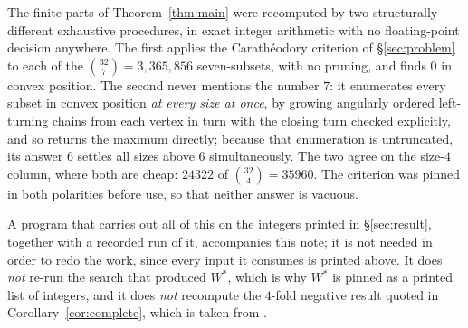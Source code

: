 \documentclass[11pt]{amsart}
\theoremstyle{remark}
\begin{document}
The finite parts of Theorem~\ref{thm:main} were recomputed by two structurally
different exhaustive procedures, in exact integer arithmetic with no
floating-point decision anywhere. The first applies the Carath\'eodory
criterion of \S\ref{sec:problem} to each of the $\binom{32}{7}=3{,}365{,}856$
seven-subsets, with no pruning, and finds $0$ in convex position. The second
never mentions the number $7$: it enumerates every subset in convex position
\emph{at every size at once}, by growing angularly ordered left-turning chains
from each vertex in turn with the closing turn checked explicitly, and so
returns the maximum directly; because that enumeration is untruncated, its
answer $6$ settles all sizes above $6$ simultaneously. The two agree on the
size-$4$ column, where both are cheap: $24322$ of $\binom{32}{4}=35960$. The
criterion was pinned in both polarities before use, so that neither answer is
vacuous.

A program that carries out all of this on the integers printed in
\S\ref{sec:result}, together with a recorded run of it, accompanies this note;
it is not needed in order to redo the work, since every input it consumes is
printed above. It does \emph{not} re-run the search that produced $W^{*}$,
which is why $W^{*}$ is pinned as a printed list of integers, and it does
\emph{not} recompute the $4$-fold negative result quoted in
Corollary~\ref{cor:complete}, which is taken from \cite{SMQH}.
\end{document}
